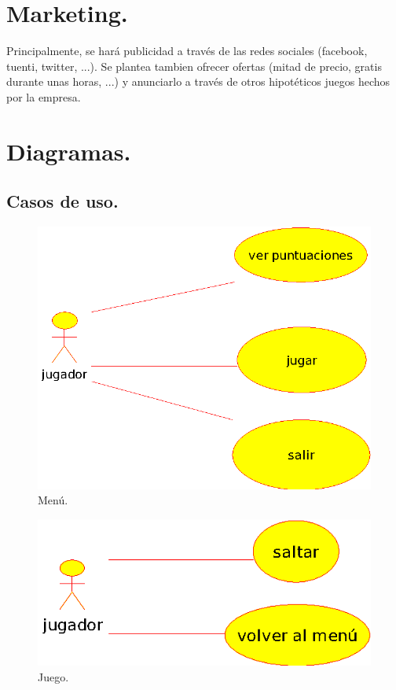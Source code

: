 \documentclass[12 pt, a4paper, twoside]{article}
\begin{document}
\section{Marketing.}
Principalmente, se hará publicidad a través de las redes sociales (facebook,
tuenti, twitter, ...). Se plantea tambien ofrecer ofertas (mitad de precio,
gratis durante unas horas, ...) y anunciarlo a través de otros hipotéticos
juegos hechos por la empresa.

\section{Diagramas.}
\subsection{Casos de uso.}
\begin{figure}[h]
\centering
\includegraphics[width = 10 cm]{casos_de_uso_(menu).eps}
\caption{Menú.}
\end{figure}

\begin{figure}[h]
\centering
\includegraphics[width = 10 cm]{casos_de_uso_(juego).eps}
\caption{Juego.}
\end{figure}

\clearpage


\end{document}
